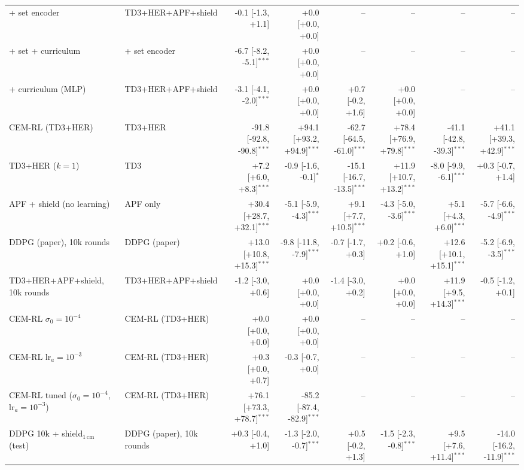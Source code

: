 \begin{table}[t]
\begin{tabular}{llrrrrrr}
\quad + set encoder & TD3+HER+APF+shield & -0.1 [-1.3, +1.1] & +0.0 [+0.0, +0.0] & -- & -- & -- & -- \\
\quad + set + curriculum & \quad + set encoder & -6.7 [-8.2, -5.1]$^{***}$ & +0.0 [+0.0, +0.0] & -- & -- & -- & -- \\
\quad + curriculum (MLP) & TD3+HER+APF+shield & -3.1 [-4.1, -2.0]$^{***}$ & +0.0 [+0.0, +0.0] & +0.7 [-0.2, +1.6] & +0.0 [+0.0, +0.0] & -- & -- \\
CEM-RL (TD3+HER) & TD3+HER & -91.8 [-92.8, -90.8]$^{***}$ & +94.1 [+93.2, +94.9]$^{***}$ & -62.7 [-64.5, -61.0]$^{***}$ & +78.4 [+76.9, +79.8]$^{***}$ & -41.1 [-42.8, -39.3]$^{***}$ & +41.1 [+39.3, +42.9]$^{***}$ \\
TD3+HER ($k{=}1$) & TD3 & +7.2 [+6.0, +8.3]$^{***}$ & -0.9 [-1.6, -0.1]$^{*}$ & -15.1 [-16.7, -13.5]$^{***}$ & +11.9 [+10.7, +13.2]$^{***}$ & -8.0 [-9.9, -6.1]$^{***}$ & +0.3 [-0.7, +1.4] \\
APF + shield (no learning) & APF only & +30.4 [+28.7, +32.1]$^{***}$ & -5.1 [-5.9, -4.3]$^{***}$ & +9.1 [+7.7, +10.5]$^{***}$ & -4.3 [-5.0, -3.6]$^{***}$ & +5.1 [+4.3, +6.0]$^{***}$ & -5.7 [-6.6, -4.9]$^{***}$ \\
DDPG (paper), 10k rounds & DDPG (paper) & +13.0 [+10.8, +15.3]$^{***}$ & -9.8 [-11.8, -7.9]$^{***}$ & -0.7 [-1.7, +0.3] & +0.2 [-0.6, +1.0] & +12.6 [+10.1, +15.1]$^{***}$ & -5.2 [-6.9, -3.5]$^{***}$ \\
TD3+HER+APF+shield, 10k rounds & TD3+HER+APF+shield & -1.2 [-3.0, +0.6] & +0.0 [+0.0, +0.0] & -1.4 [-3.0, +0.2] & +0.0 [+0.0, +0.0] & +11.9 [+9.5, +14.3]$^{***}$ & -0.5 [-1.2, +0.1] \\
CEM-RL $\sigma_0{=}10^{-4}$ & CEM-RL (TD3+HER) & +0.0 [+0.0, +0.0] & +0.0 [+0.0, +0.0] & -- & -- & -- & -- \\
CEM-RL lr$_a{=}10^{-3}$ & CEM-RL (TD3+HER) & +0.3 [+0.0, +0.7] & -0.3 [-0.7, +0.0] & -- & -- & -- & -- \\
CEM-RL tuned ($\sigma_0{=}10^{-4}$, lr$_a{=}10^{-3}$) & CEM-RL (TD3+HER) & +76.1 [+73.3, +78.7]$^{***}$ & -85.2 [-87.4, -82.9]$^{***}$ & -- & -- & -- & -- \\
DDPG 10k + shield$_{1\,\mathrm{cm}}$ (test) & DDPG (paper), 10k rounds & +0.3 [-0.4, +1.0] & -1.3 [-2.0, -0.7]$^{***}$ & +0.5 [-0.2, +1.3] & -1.5 [-2.3, -0.8]$^{***}$ & +9.5 [+7.6, +11.4]$^{***}$ & -14.0 [-16.2, -11.9]$^{***}$ \\
\bottomrule
\end{tabular}
\end{table}